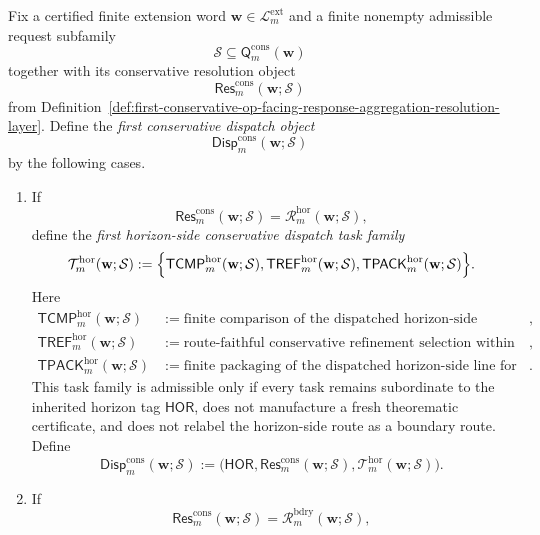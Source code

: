\begin{definition}
\label{def:first-conservative-resolution-to-task-dispatch-layer}
Fix a certified finite extension word \(\mathbf w\in\mathcal L^{\mathrm{ext}}_{m}\) and a finite nonempty admissible request subfamily
\[
  \mathcal S \subseteq \mathsf{Q}^{\mathrm{cons}}_{m}(\mathbf w)
\]
together with its conservative resolution object
\[
  \mathsf{Res}^{\mathrm{cons}}_{m}(\mathbf w;\mathcal S)
\]
from Definition~\ref{def:first-conservative-op-facing-response-aggregation-resolution-layer}. Define the \emph{first conservative dispatch object}
\[
  \mathsf{Disp}^{\mathrm{cons}}_{m}(\mathbf w;\mathcal S)
\]
by the following cases.
\begin{enumerate}[label=(\roman*)]
  \item If
  \[
    \mathsf{Res}^{\mathrm{cons}}_{m}(\mathbf w;\mathcal S)
    =
    \mathcal R^{\mathrm{hor}}_{m}(\mathbf w;\mathcal S),
  \]
  define the \emph{first horizon-side conservative dispatch task family}
  \[
    \mathcal T^{\mathrm{hor}}_{m}(\mathbf w;\mathcal S)
    :=
    \Bigl\{
      \mathsf{TCMP}^{\mathrm{hor}}_{m}(\mathbf w;\mathcal S),
      \mathsf{TREF}^{\mathrm{hor}}_{m}(\mathbf w;\mathcal S),
      \mathsf{TPACK}^{\mathrm{hor}}_{m}(\mathbf w;\mathcal S)
    \Bigr\}.
  \]
  Here
  \begin{align*}
    \mathsf{TCMP}^{\mathrm{hor}}_{m}(\mathbf w;\mathcal S) &:= \text{finite comparison of the dispatched horizon-side conservative fulfillment family},\\
    \mathsf{TREF}^{\mathrm{hor}}_{m}(\mathbf w;\mathcal S) &:= \text{route-faithful conservative refinement selection within the inherited horizon-side line},\\
    \mathsf{TPACK}^{\mathrm{hor}}_{m}(\mathbf w;\mathcal S) &:= \text{finite packaging of the dispatched horizon-side line for later OP-facing reuse}.
  \end{align*}
  This task family is admissible only if every task remains subordinate to the inherited horizon tag \(\mathsf{HOR}\), does not manufacture a fresh theorematic certificate, and does not relabel the horizon-side route as a boundary route. Define
  \[
    \mathsf{Disp}^{\mathrm{cons}}_{m}(\mathbf w;\mathcal S)
    :=
    \bigl(\mathsf{HOR},\mathsf{Res}^{\mathrm{cons}}_{m}(\mathbf w;\mathcal S),\mathcal T^{\mathrm{hor}}_{m}(\mathbf w;\mathcal S)\bigr).
  \]
  \item If
  \[
    \mathsf{Res}^{\mathrm{cons}}_{m}(\mathbf w;\mathcal S)
    =
    \mathcal R^{\mathrm{bdry}}_{m}(\mathbf w;\mathcal S),
\]
\end{enumerate}
\end{definition}
